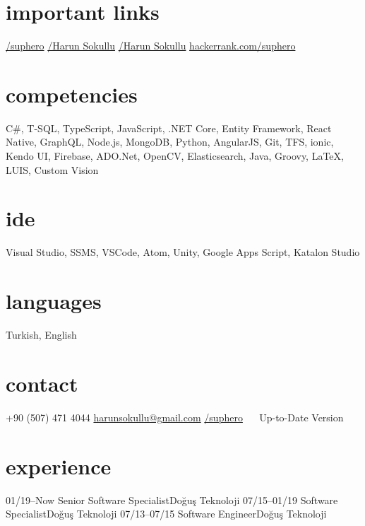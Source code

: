 \documentclass[]{../friggeri-cv} %
\begin{document}

\begin{aside}
\section{important links}
\href{https://github.com/suphero}{\faGithub/suphero}
\href{https://play.google.com/store/apps/developer?id=Harun+Sokullu}{\faAndroid/Harun Sokullu}
\href{https://itunes.apple.com/tr/developer/harun-sokullu/id1265151811}{\faApple/Harun Sokullu}
\href{https://www.hackerrank.com/suphero}{hackerrank.com/suphero}
\section{competencies}
C\#, T-SQL, TypeScript, JavaScript, .NET Core, Entity Framework, React Native, GraphQL, Node.js, MongoDB, Python, AngularJS, Git, TFS, ionic, Kendo UI, Firebase, ADO.Net, OpenCV, Elasticsearch, Java, Groovy, \LaTeX, LUIS, Custom Vision
\section{ide}
Visual Studio, SSMS, VSCode, Atom, Unity, Google Apps Script, Katalon Studio
\section{languages}
Turkish, English
\section{contact}
+90 (507) 471 4044
\href{mailto:harunsokullu@gmail.com}{harunsokullu@gmail.com}
\href{https://www.linkedin.com/in/suphero}{\faLinkedin/suphero}
~~
Up-to-Date Version
\end{aside}

\section{experience}

\begin{entrylist}

\entry
{01/19--Now}
{Senior Software Specialist}{Doğuş Teknoloji}{}
\entry
{07/15--01/19}
{Software Specialist}{Doğuş Teknoloji}{}
\entry
{07/13--07/15}
{Software Engineer}{Doğuş Teknoloji}{}

\end{entrylist}
\end{document}
